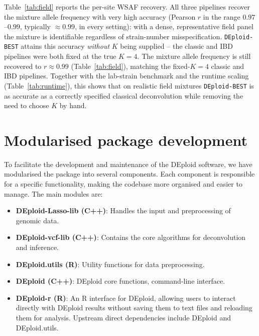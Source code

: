 \documentclass{article}
\renewcommand{\thepage}{S1-\arabic{page}}
\begin{document}
Table~\ref{tab:field} reports the per-site WSAF recovery. All three pipelines recover the
mixture allele frequency with very high accuracy (Pearson $r$ in the range
$0.97$--$0.99$, typically $\approx 0.99$, in every setting): with a dense,
representative field panel the mixture is identifiable regardless of
strain-number misspecification. {\tt DEploid-BEST} attains this accuracy
\emph{without} $K$ being supplied -- the classic and IBD pipelines were both
fixed at the true $K = 4$. The mixture allele frequency is still
recovered to $r \approx 0.99$ (Table~\ref{tab:field}), matching the fixed-$K = 4$ classic
and IBD pipelines. Together with the lab-strain benchmark and the
runtime scaling (Table~\ref{tab:runtime}), this shows that on realistic field mixtures
{\tt DEploid-BEST} is as accurate as a correctly specified classical
deconvolution while removing the need to choose $K$ by hand.



\newpage
\renewcommand{\thepage}{S4--\arabic{page}}

\setcounter{page}{1}
\section{Modularised package development}

To facilitate the development and maintenance of the DEploid software, we have modularised the package into several components. Each component is responsible for a specific functionality, making the codebase more organised and easier to manage. The main modules are:

\begin{itemize}
  \item \textbf{DEploid-Lasso-lib (C++)}: Handles the input and preprocessing of genomic data.
  \item \textbf{DEploid-vcf-lib (C++)}: Contains the core algorithms for deconvolution and inference.
  \item \textbf{DEploid.utils (R)}: Utility functions for data preprocessing.
  \item \textbf{DEploid (C++)}: DEploid core functions, command-line interface.
  \item \textbf{DEploid-r (R)}: An R interface for DEploid, allowing users to interact directly with DEploid results without saving them to text files and reloading them for analysis. Upstream direct dependencies include DEploid and DEploid.utils.
\end{itemize}
\end{document}
